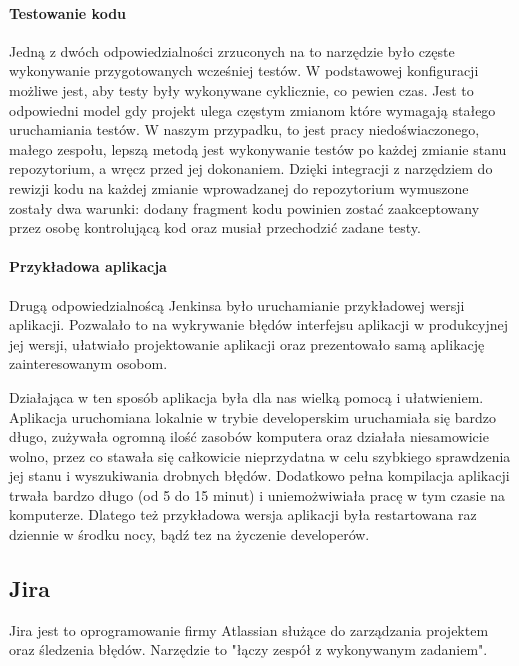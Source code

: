 \documentclass[licencjacka]{pracamgr}
\begin{document}
\paragraph{Testowanie kodu}
Jedną z dwóch odpowiedzialności zrzuconych na to narzędzie było częste wykonywanie przygotowanych wcześniej testów. W podstawowej konfiguracji możliwe jest, aby testy były wykonywane cyklicznie, co pewien czas. Jest to odpowiedni model gdy projekt ulega częstym zmianom które wymagają stałego uruchamiania testów. W naszym przypadku, to jest pracy niedoświaczonego, małego zespołu, lepszą metodą jest wykonywanie testów po każdej zmianie stanu repozytorium, a wręcz przed jej dokonaniem. Dzięki integracji z narzędziem do rewizji kodu na każdej zmianie wprowadzanej do repozytorium wymuszone zostały dwa warunki: dodany fragment kodu powinien zostać zaakceptowany przez osobę kontrolującą kod oraz musiał przechodzić zadane testy.

\paragraph{Przykładowa aplikacja}
Drugą odpowiedzialnoścą Jenkinsa było uruchamianie przykładowej wersji aplikacji. Pozwalało to na wykrywanie błędów interfejsu aplikacji w produkcyjnej jej wersji, ułatwiało projektowanie aplikacji oraz prezentowało samą aplikację zainteresowanym osobom.

Działająca w ten sposób aplikacja była dla nas wielką pomocą i ułatwieniem. Aplikacja uruchomiana lokalnie w trybie developerskim uruchamiała się bardzo długo, zużywała ogromną ilość zasobów komputera oraz działała niesamowicie wolno, przez co stawała się całkowicie nieprzydatna w celu szybkiego sprawdzenia jej stanu i wyszukiwania drobnych błędów. Dodatkowo pełna kompilacja aplikacji trwała bardzo długo (od 5 do 15 minut) i uniemożwiwiała pracę w tym czasie na komputerze. Dlatego też przykładowa wersja aplikacji była restartowana raz dziennie w środku nocy, bądź tez na życzenie developerów.  

\subsection{Jira}
Jira jest to oprogramowanie firmy Atlassian służące do zarządzania projektem oraz śledzenia błędów. 
Narzędzie to "łączy zespół z wykonywanym zadaniem".
\end{document}
